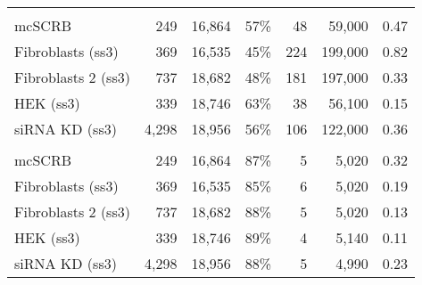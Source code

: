\begin{tabular}[t]{lrrrrrr}
\addlinespace[3mm]
\multicolumn{7}{l}{\textbf{Downsampling (original)}}\\
\hspace{1em}mcSCRB & 249 & 16,864 & 57\% & 48 & 59,000 & 0.47\\
\hspace{1em}Fibroblasts (ss3) & 369 & 16,535 & 45\% & 224 & 199,000 & 0.82\\
\hspace{1em}Fibroblasts 2 (ss3) & 737 & 18,682 & 48\% & 181 & 197,000 & 0.33\\
\hspace{1em}HEK (ss3) & 339 & 18,746 & 63\% & 38 & 56,100 & 0.15\\
\hspace{1em}siRNA KD (ss3) & 4,298 & 18,956 & 56\% & 106 & 122,000 & 0.36\\
\addlinespace[3mm]
\multicolumn{7}{l}{\textbf{Downsampling (reduced)}}\\
\hspace{1em}mcSCRB & 249 & 16,864 & 87\% & 5 & 5,020 & 0.32\\
\hspace{1em}Fibroblasts (ss3) & 369 & 16,535 & 85\% & 6 & 5,020 & 0.19\\
\hspace{1em}Fibroblasts 2 (ss3) & 737 & 18,682 & 88\% & 5 & 5,020 & 0.13\\
\hspace{1em}HEK (ss3) & 339 & 18,746 & 89\% & 4 & 5,140 & 0.11\\
\hspace{1em}siRNA KD (ss3) & 4,298 & 18,956 & 88\% & 5 & 4,990 & 0.23\\
\bottomrule
\end{tabular}
